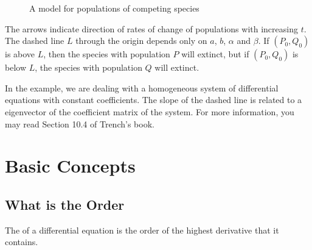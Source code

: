 \begin{example}
\begin{figure}[hbt!]
    \caption{A model for populations of competing species}
  \end{figure}
  The arrows indicate direction of rates of change of populations with increasing $t$.
  The dashed line $L$ through the origin depends only on $a$, $b$, $\alpha$ and $\beta$.
  If $(P_0,Q_0)$ is above $L$, then the species with population $P$ will extinct, but if $(P_0,Q_0)$ is below $L$, the species with population $Q$ will extinct.

  In the example, we are dealing with a homogeneous system of differential equations with constant coefficients. The slope of the dashed line is related to a eigenvector of the coefficient matrix of the system. For more information, you may read Section 10.4 of Trench's book.
\end{example}

\section{Basic Concepts}
\subsection{What is the Order}

\begin{definition}{}{}
  The  of a differential equation is the order of the highest derivative that it contains.
\end{definition}

